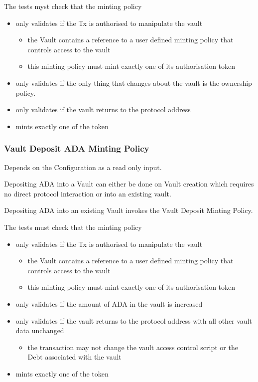 \documentclass{article} %
\begin{document}
The tests myst check that the minting policy
\begin{itemize}
  \item only validates if the Tx is authorised to manipulate the vault
  \begin{itemize}
    \item the Vault contains a reference to a user defined minting policy that controls access to the vault
    \item this minting policy must mint exactly one of its authorisation token
  \end{itemize}
  \item only validates if the only thing that changes about the vault is the ownership policy.
  \item only validates if the vault returns to the protocol address
  \item mints exactly one of the token
\end{itemize}

\subsubsection{Vault Deposit ADA Minting Policy}
Depends on the Configuration as a read only input.

Depositing ADA into a Vault can either be done on Vault creation which requires no direct protocol interaction or into an existing vault.

Depositing ADA into an existing Vault invokes the Vault Deposit Minting Policy.

The tests must check that the minting policy
\begin{itemize}
  \item only validates if the Tx is authorised to manipulate the vault
  \begin{itemize}
    \item the Vault contains a reference to a user defined minting policy that controls access to the vault
    \item this minting policy must mint exactly one of its authorisation token
  \end{itemize}
  \item only validates if the amount of ADA in the vault is increased
  \item only validates if the vault returns to the protocol address with all other vault data unchanged
  \begin{itemize}
    \item the transaction may not change the vault access control script or the Debt associated with the vault
  \end{itemize}
  \item mints exactly one of the token
\end{itemize}
\end{document}
